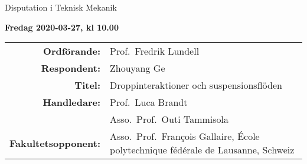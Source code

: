 \begin{frame}[plain]{Disputation i Teknisk Mekanik}
\protect\hypertarget{disputation-i-teknisk-mekanik}{}

\textbf{Fredag 2020-03-27, kl 10.00}

\begin{longtable}[]{@{}rl@{}}
  \toprule
  \endhead
  \begin{minipage}[t]{0.22\columnwidth}\raggedleft
    \textbf{Ordförande:}\strut
  \end{minipage} & \begin{minipage}[t]{0.72\columnwidth}\raggedright
    Prof.~Fredrik Lundell\strut
  \end{minipage}\tabularnewline
  \begin{minipage}[t]{0.22\columnwidth}\raggedleft
    \textbf{Respondent:}\strut
  \end{minipage} & \begin{minipage}[t]{0.72\columnwidth}\raggedright
    Zhouyang Ge\strut
  \end{minipage}\tabularnewline
  \begin{minipage}[t]{0.22\columnwidth}\raggedleft
    \textbf{Titel:}\strut
  \end{minipage} & \begin{minipage}[t]{0.72\columnwidth}\raggedright
    Droppinteraktioner och suspensionsflöden\strut
  \end{minipage}\tabularnewline
  \begin{minipage}[t]{0.22\columnwidth}\raggedleft
    \textbf{Handledare:}\strut
  \end{minipage} & \begin{minipage}[t]{0.72\columnwidth}\raggedright
    Prof.~Luca Brandt\strut
  \end{minipage}\tabularnewline
  \begin{minipage}[t]{0.22\columnwidth}\raggedleft
    \strut
  \end{minipage} & \begin{minipage}[t]{0.72\columnwidth}\raggedright
    Asso.~Prof.~Outi Tammisola\strut
  \end{minipage}\tabularnewline
  \begin{minipage}[t]{0.22\columnwidth}\raggedleft
    \textbf{Fakultetsopponent:}\strut
  \end{minipage} & \begin{minipage}[t]{0.72\columnwidth}\raggedright
    Asso.~Prof.~Fran\c{c}ois Gallaire, École polytechnique fédérale de Lausanne, Schweiz\strut

\end{minipage}
\end{longtable}
\end{frame}
